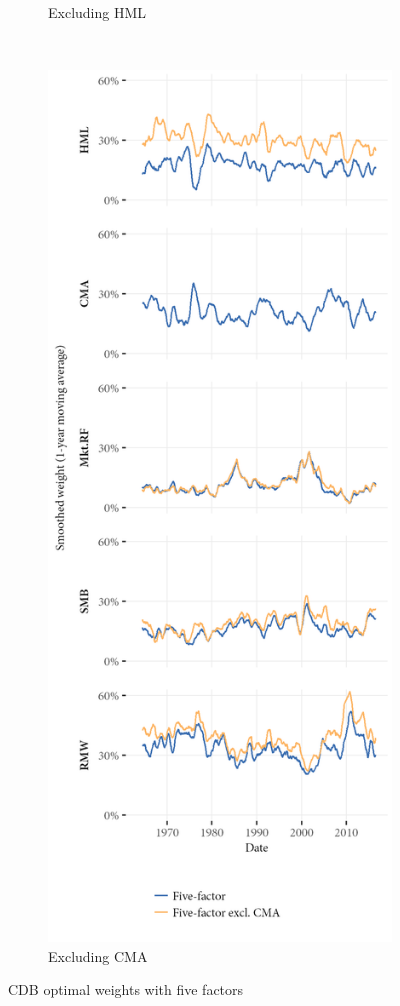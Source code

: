 \begin{figure}[H]
\begin{subfigure}{0.45\textwidth}
    \caption{Excluding HML}
  \end{subfigure}
  ~
  \begin{subfigure}{0.45\textwidth}
    \includegraphics[width=\textwidth]{graphics/weights/appendix_Weights_CDB_5F_EXCL_CMA_5F.png}
    \caption{Excluding CMA}
  \end{subfigure}  
  \caption{CDB optimal weights with five factors}
  \label{fig:cdb_optimal_5}


\end{figure}
